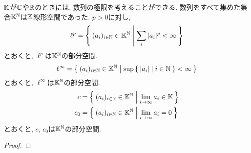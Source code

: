 \begin{example}
  $\mathbb{K}$が$\mathbb{C}$や$\mathbb{R}$のときには,
  数列の極限を考えることができる.  
  数列をすべて集めた集合$\mathbb{K}^{\mathbb{N}}$は$\mathbb{K}$線形空間であった.
  $p>0$に対し,
  \begin{align*}
    \ell^p=\Set{(a_i)_{i\in\mathbb{N}}\in \mathbb{K}^{\mathbb{N}}|\sum_i |a_i|^p < \infty}
  \end{align*}
  とおくと, $\ell^p$は$\mathbb{K}^{\mathbb{N}}$の部分空間.
  \begin{align*}
    \ell^\infty=\Set{(a_i)_{i\in\mathbb{N}}\in \mathbb{K}^{\mathbb{N}}|\sup \Set{\left|a_i\right||i\in \mathbb{N}} < \infty}
  \end{align*}
  とおくと, $\ell^\infty$は$\mathbb{K}^{\mathbb{N}}$の部分空間.
  \begin{align*}
    c&=\Set{(a_i)_{i\in\mathbb{N}} \in \mathbb{K}^{\mathbb{N}}| \lim_{i\to\infty} a_i \in\mathbb{K}}\\
    c_0&=\Set{(a_i)_{i\in\mathbb{N}} \in \mathbb{K}^{\mathbb{N}}| \lim_{i\to\infty} a_i =0}\\
  \end{align*}
  とおくと, $c$, $c_0$は$\mathbb{K}^{\mathbb{N}}$の部分空間.
\end{example}
\begin{proof}\end{proof}

